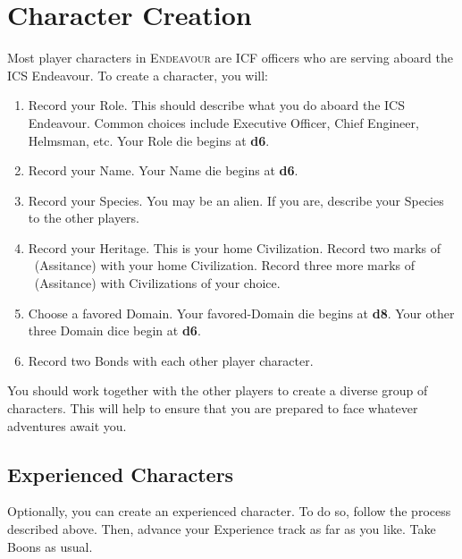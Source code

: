 \documentclass[11pt, a5paper, parskip=half-, DIV=12]{scrartcl}
\newcommand{\ENDEAVOUR}{\textsc{Endeavour}}%
\begin{document}
\newpage

\ClearShipoutPicture



\section*{Character Creation}
Most player characters in \ENDEAVOUR{} are ICF officers who are serving aboard the ICS Endeavour. To create a character, you will:
\begin{enumerate}
	\item Record your Role. This should describe what you do aboard the ICS Endeavour. Common choices include Executive Officer, Chief Engineer, Helmsman, etc.  Your Role die begins at \textbf{d6}.
	\item Record your Name. Your Name die begins at \textbf{d6}.
	\item Record your Species. You may be an alien. If you are, describe your Species to the other players.
	\item Record your Heritage. This is your home Civilization. Record two marks of ~(Assitance) with your home Civilization. Record three more marks of ~(Assitance) with Civilizations of your choice.
	\item Choose a favored Domain. Your favored-Domain die begins at \textbf{d8}. Your other three Domain dice begin at \textbf{d6}.
	\item Record two Bonds with each other player character.
\end{enumerate}
You should work together with the other players to create a diverse group of characters.  This will help to ensure that you are prepared to face whatever adventures await you.

\subsection*{Experienced Characters}
Optionally, you can create an experienced character. To do so, follow the process described above. Then, advance your Experience track as far as you like. Take Boons as usual.
\end{document}
